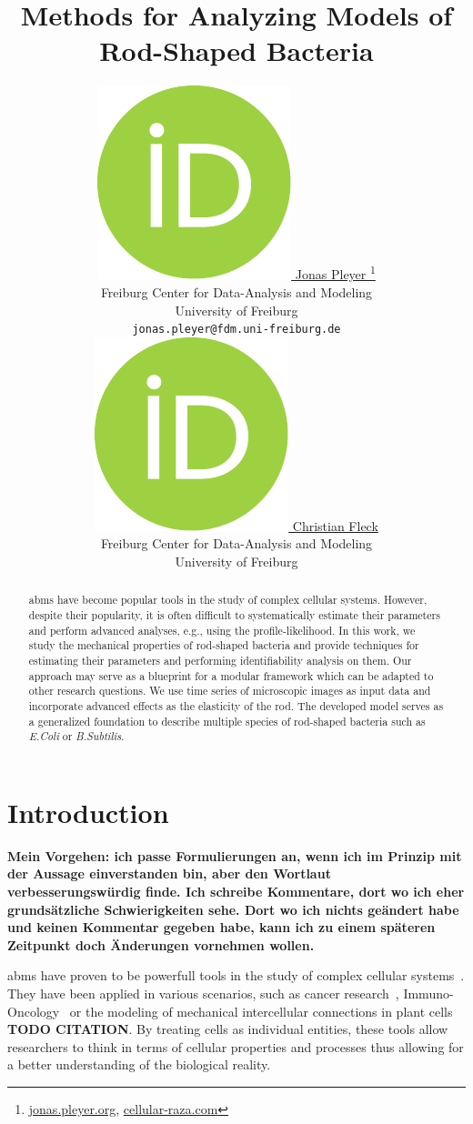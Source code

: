 \documentclass{article}
\title{Methods for Analyzing Models of\\ Rod-Shaped Bacteria}
\author{
    \href{https://orcid.org/0009-0001-0613-7978}{
        \includegraphics[scale=0.06]{figures/orcid.pdf}
        \hspace{1mm}Jonas Pleyer
    }
    \thanks{
        \href{https://jonas.pleyer.org}{jonas.pleyer.org},
        \href{https://cellular-raza.com}{cellular-raza.com}
    }\\
	Freiburg Center for Data-Analysis and Modeling\\
	University of Freiburg\\
	\texttt{jonas.pleyer@fdm.uni-freiburg.de} \\
	\And
	\href{https://orcid.org/0000-0002-6371-4495}{
        \includegraphics[scale=0.06]{figures/orcid.pdf}
        \hspace{1mm}Christian Fleck
    }\\
	Freiburg Center for Data-Analysis and Modeling\\
	University of Freiburg
}
\begin{document}
\maketitle


\begin{abstract}
    \aclp{abm} have become popular tools in the study of complex cellular systems.
    However, despite their popularity, it is often difficult to systematically estimate their
    parameters and perform advanced analyses, e.g., using the profile-likelihood.
    In this work, we study the mechanical properties of rod-shaped bacteria and provide techniques
    for estimating their parameters and performing identifiability analysis on them.
    Our approach may serve as a blueprint for a modular framework which can be adapted to other
    research questions.
    We use time series of microscopic images as input data and incorporate advanced effects as the
    elasticity of the rod.
    The developed model serves as a generalized foundation to describe multiple species of
    rod-shaped bacteria such as \textit{E.Coli} or \textit{B.Subtilis}.
\end{abstract}


\pagebreak
\renewcommand{\contentsname}{Table of Contents (remove before submission)}
\tableofcontents
\vfill
\pagebreak

\section{Introduction}
\textbf{
    Mein Vorgehen: ich passe Formulierungen an, wenn ich im Prinzip mit der Aussage einverstanden
    bin, aber den Wortlaut verbesserungswürdig finde.
    Ich schreibe Kommentare, dort wo ich eher grundsätzliche Schwierigkeiten sehe.
    Dort wo ich nichts geändert habe und keinen Kommentar gegeben habe, kann ich zu einem späteren
    Zeitpunkt doch Änderungen vornehmen wollen.
}

\acp{abm} have proven to be powerfull tools in the study of complex cellular
systems~\cite{Pleyer2023}.
They have been applied in various scenarios, such as cancer
research~\cite{Ghaffarizadeh2018,Cooper2020}, Immuno-Oncology~\cite{Karolak2021} or the modeling
of mechanical intercellular connections in plant cells \textbf{TODO CITATION}.
By treating cells as individual entities, these tools allow researchers to think in terms of
cellular properties and processes thus allowing for a better understanding of the biological
reality.
\end{document}
